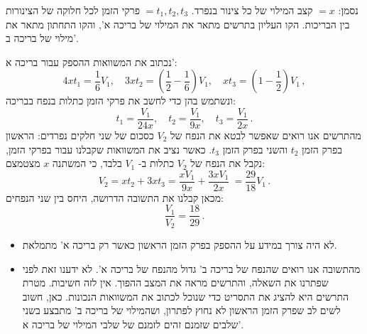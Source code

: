 \documentclass[12pt,a4paper]{article}
\begin{document}
נסמן:
$=x$
קצב המילוי של כל צינור בנפרד. 
$=t_1, t_2, t_3$
פרקי הזמן לכל חלוקה של הצינורות בין הבריכות. הקו העליון בתרשים מתאר את המילוי של בריכה א', והקו התחתון מתאר את מילוי של בריכה ב'.

נכתוב את המשוואות ההספק עבור בריכה א':
\[
4x t_1 = \frac{1}{6}V_1,\quad 3x t_2 = (\frac{1}{2}-\frac{1}{6})V_1,\quad xt_3=(1-\frac{1}{2})V_1\,,
\]
ונשתמש בהן כדי לחשב את פרקי הזמן כתלות בנפח בבריכה:
\[
t_1 = \frac{V_1}{24x},\quad t_2 = \frac{V_1}{9x},\quad t_3=\frac{V_1}{2x}\,.
\]
מהתרשים אנו רואים שאפשר לבטא את הנפח של
$V_2$
כסכום של שני חלקים נפרדים: הראשון בפרק הזמן
$t_2$
והשני בפרק הזמן
$t_3$.
כאשר נציב את המשוואות שקבלנו עבור בפרקי הזמן, נקבל את הנפח של
$V_2$
כתלות ב-%
$V_1$
בלבד, כי המשתנה 
$x$ מצטמצם:
\[
V_2 = xt_2 + 3xt_3 = \frac{x V_1}{9x} + \frac{3x V_1}{2x}\ = \frac{29}{18}V_1\,.
\]
מכאן קבלנו את התשובה הדרושה, היחס בין שני הנפחים:
\[
\frac{V_1}{V_2} = \frac{18}{29}\,.
\]
\begin{itemize}
\item 
לא היה צורך במידע על ההספק בפרק הזמן הראשון כאשר רק בריכה א' מתמלאת.
\item
מהתשובה אנו רואים שהנפח של בריכה ב' גדול מהנפח של בריכה א'. לא ידענו זאת לפני שפתרנו את השאלה, והתרשים מראה את המצב ההפוך. אין לזה חשיבות. מטרת התרשים היא להציג את התסריט כדי שנוכל לכתוב את המשוואות הנכונות. כאן, חשוב לשים לב שפרק הזמן הראשון לא נחוץ לפתרון, ושהמילוי של בריכה ב' מתבצע בשני שלבים שזמנם זהים לזמנם של שלבי המילוי של בריכה א'.

\end{itemize}
\end{document}
